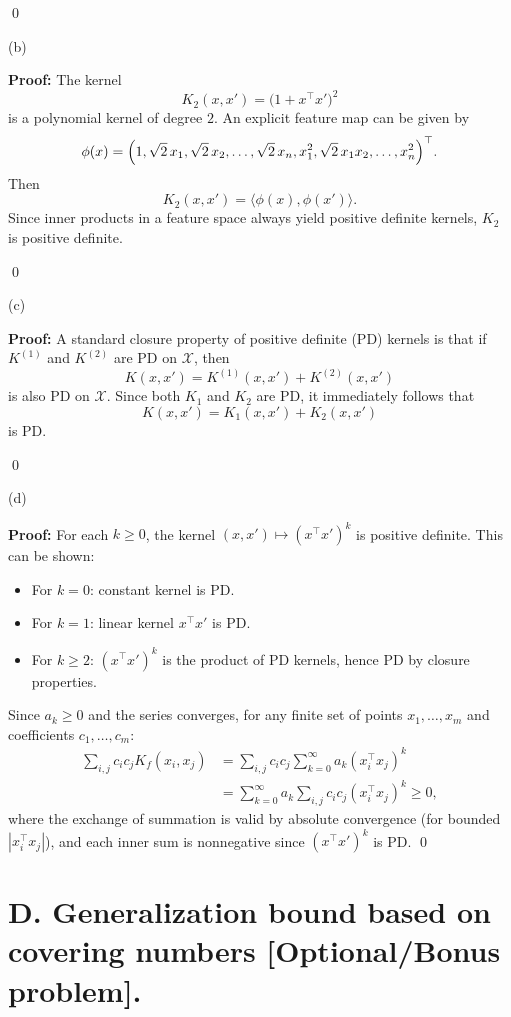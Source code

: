 \documentclass[letterpaper, 11pt]{article}
\newcommand{\1}{\mathds{1}}	%
\theoremstyle{definition}
\begin{document}
\qed

(b)

\textbf{Proof:}  
The kernel
\[
K_2(x,x') = \bigl(1 + x^\top x'\bigr)^2
\]
is a polynomial kernel of degree $2$. An explicit feature map can be given by
\[
\phi(x) = \Bigl(1,\sqrt{2}\, x_1, \sqrt{2}\, x_2, \dots, \sqrt{2}\, x_n, x_1^2, \sqrt{2}\, x_1 x_2, \dots, x_n^2\Bigr)^\top.
\]
Then
\[
K_2(x,x') = \langle \phi(x), \phi(x') \rangle.
\]
Since inner products in a feature space always yield positive definite kernels, $K_2$ is positive definite.

\qed

(c)

\textbf{Proof:}  
A standard closure property of positive definite (PD) kernels is that if $K^{(1)}$ and $K^{(2)}$ are PD on $\mathcal{X}$, then
\[
K(x,x') = K^{(1)}(x,x') + K^{(2)}(x,x')
\]
is also PD on $\mathcal{X}$. Since both $K_1$ and $K_2$ are PD, it immediately follows that
\[
K(x,x') = K_1(x,x') + K_2(x,x')
\]
is PD.

\qed

(d) 

\textbf{Proof:}  
For each $k \geq 0$, the kernel $(x,x') \mapsto (x^\top x')^k$ is positive definite. This can be shown:
\begin{itemize}
\item For $k=0$: constant kernel is PD.
\item For $k=1$: linear kernel $x^\top x'$ is PD.
\item For $k \geq 2$: $(x^\top x')^k$ is the product of PD kernels, hence PD by closure properties.
\end{itemize}

Since $a_k \geq 0$ and the series converges, for any finite set of points $x_1,\ldots,x_m$ and coefficients $c_1,\ldots,c_m$:
\begin{align*}
\sum_{i,j} c_i c_j K_f(x_i,x_j) &= \sum_{i,j} c_i c_j \sum_{k=0}^\infty a_k (x_i^\top x_j)^k \\
&= \sum_{k=0}^\infty a_k \sum_{i,j} c_i c_j (x_i^\top x_j)^k \geq 0,
\end{align*}
where the exchange of summation is valid by absolute convergence (for bounded $|x_i^\top x_j|$), and each inner sum is nonnegative since $(x^\top x')^k$ is PD.
\qed

\section*{D. Generalization bound based on covering numbers [Optional/Bonus problem].}
\end{document}
